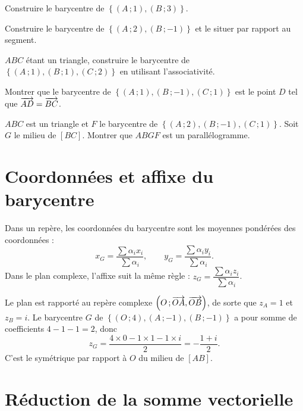 \begin{entrainement}
\exo[\niveau{1}] Construire le barycentre de
$\left\{(A\,;1),(B\,;3)\right\}$.

\exo[\niveau{1}] Construire le barycentre de
$\left\{(A\,;2),(B\,;-1)\right\}$ et le situer par rapport au segment.

\exo[\niveau{2}] $ABC$ étant un triangle, construire le barycentre de
$\left\{(A\,;1),(B\,;1),(C\,;2)\right\}$ en utilisant l'associativité.

\exo[\niveau{2}] Montrer que le barycentre de
$\left\{(A\,;1),(B\,;-1),(C\,;1)\right\}$ est le point $D$ tel que
$\overrightarrow{AD} = \overrightarrow{BC}$.

\exo[\niveau{3}] $ABC$ est un triangle et $F$ le barycentre de
$\left\{(A\,;2),(B\,;-1),(C\,;1)\right\}$. Soit $G$ le milieu de $[BC]$.
Montrer que $ABGF$ est un parallélogramme.
\end{entrainement}

\section{Coordonnées et affixe du barycentre}

\begin{propriete}
Dans un repère, les coordonnées du barycentre sont les moyennes pondérées des
coordonnées :
\[
  x_{G} = \frac{\sum \alpha_{i}x_{i}}{\sum \alpha_{i}},
  \qquad
  y_{G} = \frac{\sum \alpha_{i}y_{i}}{\sum \alpha_{i}} .
\]
Dans le plan complexe, l'affixe suit la même règle :
$z_{G} = \dfrac{\sum \alpha_{i}z_{i}}{\sum \alpha_{i}}$.
\end{propriete}

\begin{exemple}
Le plan est rapporté au repère complexe
$\left(O\,;\overrightarrow{OA},\overrightarrow{OB}\right)$, de sorte que $z_{A} = 1$ et
$z_{B} = i$. Le barycentre $G$ de
$\left\{(O\,;4),(A\,;-1),(B\,;-1)\right\}$ a pour somme de coefficients
$4-1-1 = 2$, donc
\[
  z_{G} = \frac{4 \times 0-1 \times 1-1 \times i}{2} = -\frac{1+i}{2}.
\]
C'est le symétrique par rapport à $O$ du milieu de $[AB]$.
\end{exemple}

\section{Réduction de la somme vectorielle}

